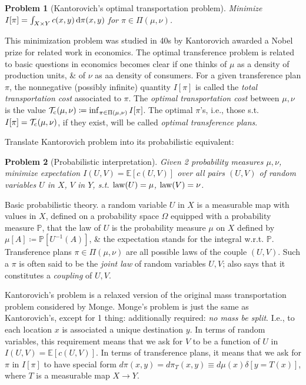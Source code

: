 \documentclass{article}
\newtheorem{problem}{Problem}
\begin{document}
\begin{enumerate}
\begin{itemize}
		\begin{problem}[Kantorovich's optimal transportation problem]
			Minimize $I[\pi] = \int_{X\times Y} c(x,y)\,{\rm d}\pi(x,y)$ for $\pi\in\Pi(\mu,\nu)$.
		\end{problem}
		This minimization problem was studied in 40s by {\sc Kantorovich} awarded a Nobel prize for related work in economics. The optimal transference problem is related to basic questions in economics becomes clear if one thinks of $\mu$ as a density of production units, \& of $\nu$ as aa density of consumers. For a given transference plan $\pi$, the nonnegative (possibly infinite) quantity $I[\pi]$ is called the {\it total transportation cost} associated to $\pi$. The {\it optimal transportation cost} between $\mu,\nu$ is the value $\mathcal{T}_{\rm c}(\mu,\nu)\coloneqq\inf_{\pi\in\Pi(\mu,\nu)} I[\pi]$. The optimal $\pi$'s, i.e., those s.t. $I[\pi] = \mathcal{T}_{\rm c}(\mu,\nu)$, if they exist, will be called {\it optimal transference plans}.

		Translate Kantorovich problem into its probabilistic equivalent:

		\begin{problem}[Probabilistic interpretation]
			Given 2 probability measures $\mu,\nu$, minimize expectation $I(U,V) = \mathbb{E}[c(U,V)]$ over all pairs $(U,V)$ of random variables $U$ in $X$, $V$ in $Y$, s.t. ${\rm law}(U) = \mu$, ${\rm law}(V) = \nu$.
		\end{problem}
		{\sf Basic probabilistic theory.} a random variable $U$ in $X$ is a measurable map with values in $X$, defined on a probability space $\Omega$ equipped with a probability measure $\mathbb{P}$, that the {\rm law} of $U$ is the probability measure $\mu$ on $X$ defined by $\mu[A]\coloneqq\mathbb{P}[U^{-1}(A)]$, \& the expectation stands for the integral w.r.t. $\mathbb{P}$. Transference plans $\pi\in\Pi(\mu,\nu)$ are all possible laws of the couple $(U,V)$. Such a $\pi$ is often said to be the {\it joint law} of random variables $U,V$; also says that it constitutes a {\it coupling} of $U,V$.

		Kantorovich's problem is a relaxed version of the original mass transportation problem considered by {\sc Monge}. {\sc Monge}'s problem is just the same as {\sc Kantorovich}'s, except for 1 thing: additionally required: {\it no mass be split}. I.e., to each location $x$ is associated a unique destination $y$. In terms of random variables, this requirement means that we ask for $V$ to be a function of $U$ in $I(U,V) = \mathbb{E}[c(U,V)]$. In terms of transference plans, it means that we ask for $\pi$ in $I[\pi]$ to have special form $d\pi(x,y) = d\pi_T(x,y)\equiv d\mu(x)\delta[y = T(x)]$, where $T$ is a measurable map $X\to Y$.


\end{itemize}
\end{enumerate}
\end{document}
